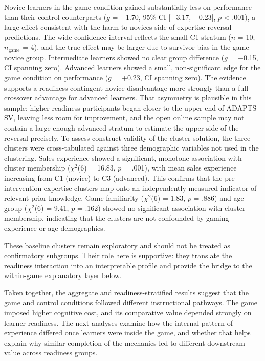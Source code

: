 \documentclass[12pt]{report}
\begin{document}
Novice learners in the game condition gained substantially less on performance than their control counterparts ($g$ = $-$1.70, 95\% CI [$-$3.17, $-$0.23], $p$ < .001), a large effect consistent with the harm-to-novices side of expertise reversal predictions. The wide confidence interval reflects the small C1 stratum ($n$ = 10; $n_\text{game}$ = 4), and the true effect may be larger due to survivor bias in the game novice group. Intermediate learners showed no clear group difference ($g$ = $-$0.15, CI spanning zero). Advanced learners showed a small, non-significant edge for the game condition on performance ($g$ = +0.23, CI spanning zero). The evidence supports a readiness-contingent novice disadvantage more strongly than a full crossover advantage for advanced learners. That asymmetry is plausible in this sample: higher-readiness participants began closer to the upper end of ADAPTS-SV, leaving less room for improvement, and the open online sample may not contain a large enough advanced stratum to estimate the upper side of the reversal precisely. To assess construct validity of the cluster solution, the three clusters were cross-tabulated against three demographic variables not used in the clustering. Sales experience showed a significant, monotone association with cluster membership ($\chi^2$(6) = 16.83, $p$ = .001), with mean sales experience increasing from C1 (novice) to C3 (advanced). This confirms that the pre-intervention expertise clusters map onto an independently measured indicator of relevant prior knowledge. Game familiarity ($\chi^2$(6) = 1.83, $p$ = .886) and age group ($\chi^2$(6) = 9.41, $p$ = .162) showed no significant association with cluster membership, indicating that the clusters are not confounded by gaming experience or age demographics.

These baseline clusters remain exploratory and should not be treated as confirmatory subgroups. Their role here is supportive: they translate the readiness interaction into an interpretable profile and provide the bridge to the within-game explanatory layer below.

Taken together, the aggregate and readiness-stratified results suggest that the game and control conditions followed different instructional pathways. The game imposed higher cognitive cost, and its comparative value depended strongly on learner readiness. The next analyses examine how the internal pattern of experience differed once learners were inside the game, and whether that helps explain why similar completion of the mechanics led to different downstream value across readiness groups.
\end{document}

